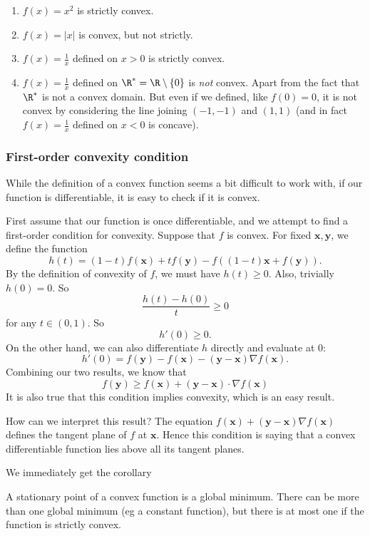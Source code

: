 \documentclass[a4paper]{article}
\begin{document}
\begin{eg}\leavevmode
  \begin{enumerate}
    \item $f(x) = x^2$ is strictly convex.
    \item $f(x) = |x|$ is convex, but not strictly.
    \item $f(x) = \frac{1}{x}$ defined on $x > 0$ is strictly convex.
    \item $f(x) = \frac{1}{x}$ defined on $\R^* = \R \setminus \{0\}$ is \emph{not} convex. Apart from the fact that $\R^*$ is not a convex domain. But even if we defined, like $f(0) = 0$, it is not convex by considering the line joining $(-1, -1)$ and $(1, 1)$ (and in fact $f(x) = \frac{1}{x}$ defined on $x < 0$ is concave).
  \end{enumerate}
\end{eg}
\subsubsection{First-order convexity condition}
While the definition of a convex function seems a bit difficult to work with, if our function is differentiable, it is easy to check if it is convex.

First assume that our function is once differentiable, and we attempt to find a first-order condition for convexity. Suppose that $f$ is convex. For fixed $\mathbf{x}, \mathbf{y}$, we define the function
\[
  h(t) = (1 - t)f(\mathbf{x}) + tf(\mathbf{y}) - f((1 - t)\mathbf{x} + f(\mathbf{y})).
\]
By the definition of convexity of $f$, we must have $h(t) \geq 0$. Also, trivially $h(0) = 0$. So
\[
  \frac{h(t) - h(0)}{t} \geq 0
\]
for any $t\in (0, 1)$. So
\[
  h'(0) \geq 0.
\]
On the other hand, we can also differentiate $h$ directly and evaluate at $0$:
\[
  h'(0) = f(\mathbf{y}) - f(\mathbf{x}) - (\mathbf{y} - \mathbf{x})\nabla f (\mathbf{x}).
\]
Combining our two results, we know that
\[
  f(\mathbf{y}) \geq f(\mathbf{x}) + (\mathbf{y} - \mathbf{x})\cdot \nabla f(\mathbf{x}) \tag{$\dagger$}
\]
It is also true that this condition implies convexity, which is an easy result.

How can we interpret this result? The equation $f(\mathbf{x}) + (\mathbf{y} - \mathbf{x})\nabla f(\mathbf{x})$ defines the tangent plane of $f$ at $\mathbf{x}$. Hence this condition is saying that a convex differentiable function lies above all its tangent planes.

We immediately get the corollary
\begin{cor}
  A stationary point of a convex function is a global minimum. There can be more than one global minimum (eg a constant function), but there is at most one if the function is strictly convex.
\end{cor}
\end{document}
